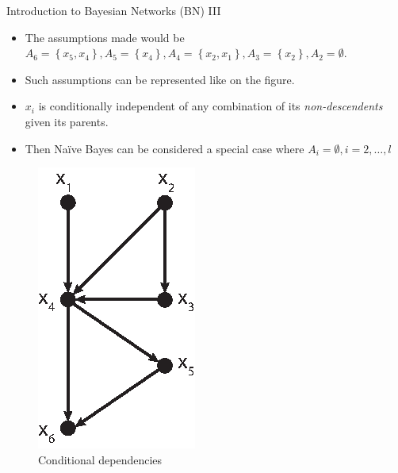 \documentclass[xcolor=x11names,compress]{beamer}
\renewcommand{\(}{\begin{columns}}
\renewcommand{\)}{\end{columns}}
\newcommand{\<}[1]{\begin{column}{#1}}
\renewcommand{\>}{\end{column}}
\begin{document}
\begin{frame}{Introduction to Bayesian Networks (BN) III}
\begin{itemize}
\item The assumptions made would be $A_6 = \left \{  x_5, x_4 \right \}, A_5 = \left \{  x_4 \right \}, A_4 = \left \{  x_2, x_1 \right \}, A_3 = \left \{  x_2 \right \}, A_2 = \emptyset$.
	\item Such assumptions can be represented like on the figure.
	\item $x_i$ is conditionally independent of any combination of its \emph{non-descendents} given its parents.
	\item Then Naïve Bayes can be considered a special case where $A_i = \emptyset, i = 2, \ldots, l$
\end{itemize}

\begin{figure}[h]
	\centering
	\includegraphics[scale=0.5]{../report/resources/images/dependencias-condicionales}
	\caption{Conditional dependencies}
	\label{fig:dependencias-condicionales}
\end{figure}
\end{frame}
\end{document}
